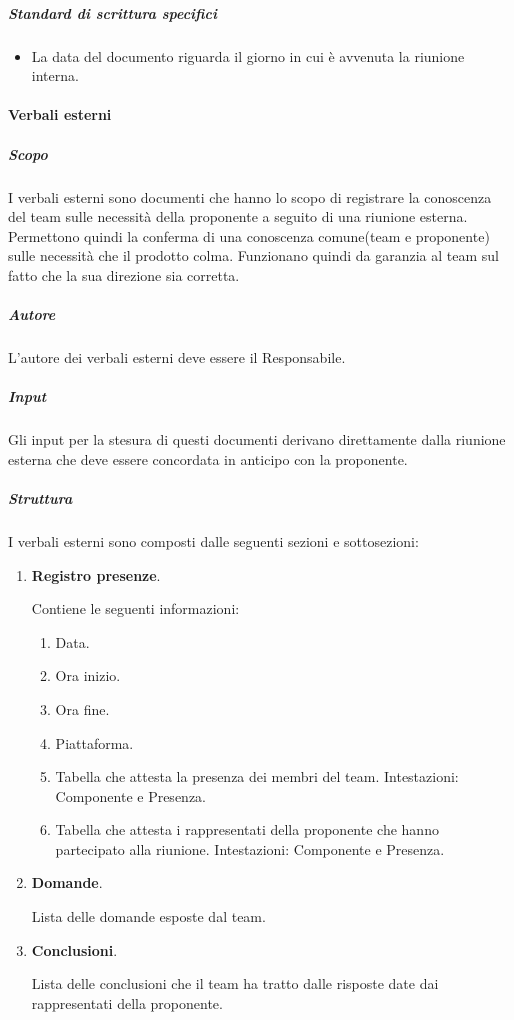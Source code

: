 \subparagraph{Standard di scrittura specifici}
\begin{itemize}
    \item La data del documento riguarda il giorno in cui è avvenuta la riunione interna.
\end{itemize}

\paragraph{Verbali esterni}

\subparagraph{Scopo}
I verbali esterni sono documenti che hanno lo scopo di registrare la conoscenza del team sulle necessità della proponente a seguito di una riunione esterna.
Permettono quindi la conferma di una conoscenza comune(team e proponente) sulle necessità che il prodotto colma.
Funzionano quindi da garanzia al team sul fatto che la sua direzione sia corretta.

\subparagraph{Autore}
L'autore dei verbali esterni deve essere il Responsabile.

\subparagraph{Input}
Gli input per la stesura di questi documenti derivano direttamente dalla riunione esterna che deve essere concordata in anticipo con la proponente.

\subparagraph{Struttura}
I verbali esterni sono composti dalle seguenti sezioni e sottosezioni:
\begin{enumerate}
    \item \textbf{Registro presenze}.
    
    Contiene le seguenti informazioni:
    \begin{enumerate}
        \item Data.
        \item Ora inizio.
        \item Ora fine.
        \item Piattaforma.
        \item Tabella che attesta la presenza dei membri del team.
        Intestazioni: Componente e Presenza.
        \item Tabella che attesta i rappresentati della proponente che hanno partecipato alla riunione.
        Intestazioni: Componente e Presenza.
    \end{enumerate}

    \item \textbf{Domande}.
    
    Lista delle domande esposte dal team.

    \item \textbf{Conclusioni}.
    
    Lista delle conclusioni che il team ha tratto dalle risposte date dai rappresentati della proponente.
\end{enumerate}

